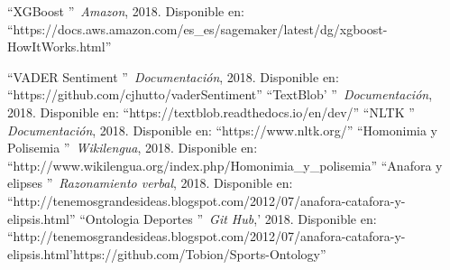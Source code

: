 \documentclass[../all.tex]{subfiles}
\begin{document}
\begin{thebibliography}{37}
			\textquotedblleft XGBoost
			\textquotedblright\, \textit{Amazon},
			2018.
			Disponible en: ``https://docs.aws.amazon.com/es\_es/sagemaker/latest/dg/xgboost-HowItWorks.html''
		
			\textquotedblleft VADER Sentiment
			\textquotedblright\, \textit{Documentación},
			2018.
			Disponible en: ``https://github.com/cjhutto/vaderSentiment''
			\textquotedblleft TextBlob'
			\textquotedblright\, \textit{Documentación},
			2018.
			Disponible en: ``https://textblob.readthedocs.io/en/dev/''
			\textquotedblleft NLTK
			\textquotedblright\, \textit{Documentación},
			2018.
			Disponible en: ``https://www.nltk.org/''
			\textquotedblleft Homonimia y Polisemia
			\textquotedblright\, \textit{Wikilengua},
			2018.
			Disponible en: ``http://www.wikilengua.org/index.php/Homonimia\_y\_polisemia''
			\textquotedblleft Anafora y elipses
			\textquotedblright\, \textit{Razonamiento verbal},
			2018.
			Disponible en: ``http://tenemosgrandesideas.blogspot.com/2012/07/anafora-catafora-y-elipsis.html''
			\textquotedblleft Ontologia Deportes
			\textquotedblright\ \textit{Git Hub},'
			2018.
			Disponible en: ``http://tenemosgrandesideas.blogspot.com/2012/07/anafora-catafora-y-elipsis.html'https://github.com/Tobion/Sports-Ontology''
\end{thebibliography}

%
\end{document}
